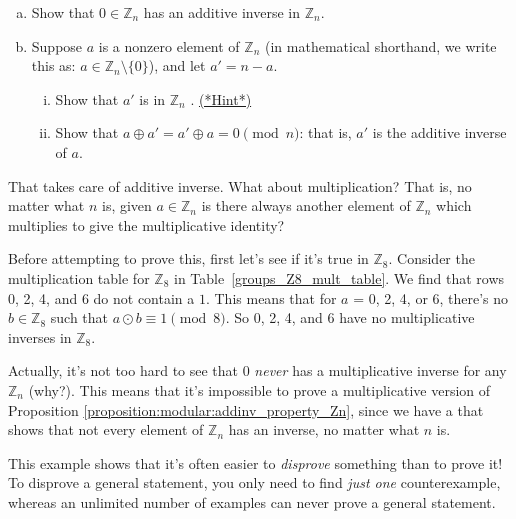 \begin{exercise}{58}

\begin{enumerate}[(a)]
\item
Show that  $0 \in {\mathbb Z}_n$ has an additive inverse in ${\mathbb Z}_n$.

\item
Suppose $a$ is a nonzero element of ${\mathbb Z}_n$  (in mathematical shorthand, we write this as: $a \in {\mathbb Z}_n \setminus \{0\}$), and let $a' = n-a$.
\begin{enumerate}[(i)]
\item
Show that $a'$ is in ${\mathbb Z}_n$ .
\hyperref[sec:modular_arithmetic:hints]{(*Hint*)}
\item
Show that $a \oplus a' = a' \oplus a  = 0 \pmod{ n}$: that is, $a'$ is the additive inverse of $a$.
\end{enumerate}
\end{enumerate}
\end{exercise}


That takes care of additive inverse. What about multiplication? That is, no matter what $n$ is, given $a \in {\mathbb Z}_n$ is there always another element of ${\mathbb Z}_n$ which multiplies to give the multiplicative identity?  

Before attempting to prove this, first let's see if it's true in ${\mathbb Z}_8$. Consider the multiplication table for ${\mathbb Z}_8$ in Table~\ref{groups_Z8_mult_table}.  We find that  rows 0, 2, 4, and 6 do not contain a $1$. This means that  for $a$ = 0, 2,  4, or 6, there's no $b \in {\mathbb Z}_8$ such that $a \odot b \equiv 1 \pmod{ 8}$.  So 0, 2, 4, and 6 have no multiplicative inverses  in ${\mathbb Z}_8$. 

Actually, it's not too hard to see that 0 \emph{never} has a multiplicative inverse for any ${\mathbb Z}_n$ (why?). This means that it's impossible to prove a multiplicative version of Proposition \ref{proposition:modular:addinv_property_Zn}, since we have a  that shows that not every element of ${\mathbb Z}_n$ has an inverse, no matter what $n$ is.

\begin{rem}
This example shows that it's often easier to \emph{disprove} something than to prove it!  To disprove a general statement, you only need to find \emph{just one} counterexample, whereas an unlimited number of examples can never prove a general statement.
\end{rem}

